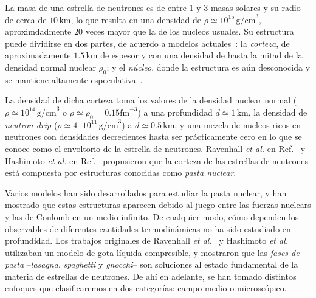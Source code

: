 La masa de una estrella de neutrones es de entre 1 y 3 masas solares y su radio de cerca de $10\,\text{km}$, lo que resulta en una densidad de $\rho \simeq 10^{15}\,\text{g/cm}^3$, aproximdadmente 20 veces mayor que la de los nucleos usuales.
Su estructura puede dividirse en dos partes, de acuerdo a modelos actuales~\cite{page_minimal_2004, geppert_temperature_2004}: la \emph{corteza}, de aproximadamente $1.5\,\text{km}$ de espesor y con una densidad de hasta la mitad de la densidad normal nuclear $\rho_0$; y el \emph{núcleo}, donde la estructura es aún desconocida y se mantiene altamente especulativa~\cite{akmal_equation_1998, ravenhall_structure_1983, oyamatsu_nuclear_1993, woosley_physics_2005}.

La densidad de dicha corteza toma los valores de la densidad nuclear normal ($\rho \simeq 10^{14}\,\text{g/cm}^3$ o $ \rho \simeq \rho_0=0.15 \text{fm}^{-3}$) a una profundidad $d \simeq 1\,\text{km}$, la densidad de \emph{neutron drip} ($\rho\simeq 4 \cdot 10^{11}\,\text{g/cm}^3$) a $d\simeq 0.5\,\text{km}$, y una mezcla de nucleos ricos en neutrones con densidades decrecientes hasta ser prácticamente cero en lo que se conoce como el envoltorio de la estrella de neutrones.
Ravenhall \emph{et al.} en Ref.~\cite{ravenhall_structure_1983} y Hashimoto \emph{et al.} en Ref.~\cite{hashimoto_shape_1984} propusieron que la corteza de las estrellas de neutrones está compuesta por estructuras conocidas como \emph{pasta nuclear}.

Varios modelos han sido desarrollados para estudiar la pasta nuclear, y han mostrado que estas estructuras aparecen debido al juego entre las fuerzas nuclears y las de Coulomb en un medio infinito.
De cualquier modo, cómo dependen los observables de diferentes cantidades termodinámicas no ha sido estudiado en profundidad.
Los trabajos originales de Ravenhall \emph{et al.}~\cite{ravenhall_structure_1983} y Hashimoto \emph{et al.}~\cite{hashimoto_shape_1984} utilizaban un modelo de gota líquida compresible, y mostraron que las \emph{fases de pasta}
--\emph{lasagna}, \emph{spaghetti} y \emph{gnocchi}-- son soluciones al estado fundamental de la materia de estrellas de neutrones.
De ahí en adelante, se han tomado distintos enfoques que clasificaremos en dos categorías: campo medio o microscópico.

